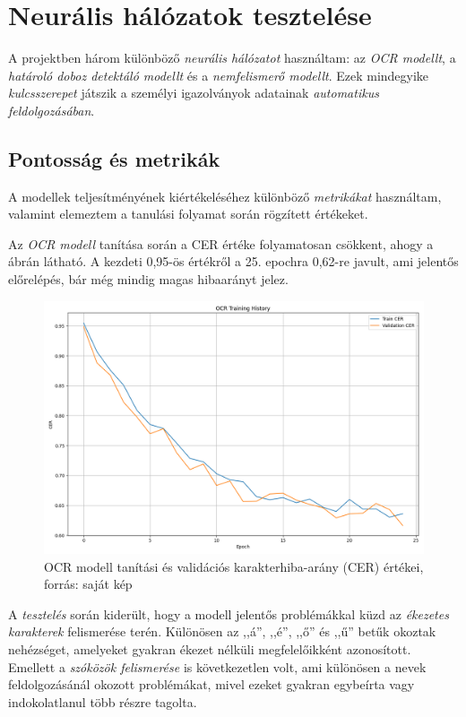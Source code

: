 \documentclass[
]{thesis-ekf}
\theoremstyle{definition}
\theoremstyle{remark}
\begin{document}
\section{Neurális hálózatok tesztelése} A projektben három különböző \emph{neurális hálózatot} használtam: az \emph{OCR modellt}, a \emph{határoló doboz detektáló modellt} és a \emph{nemfelismerő modellt}. Ezek mindegyike \emph{kulcsszerepet} játszik a személyi igazolványok adatainak \emph{automatikus feldolgozásában}.

\subsection{Pontosság és metrikák} A modellek teljesítményének kiértékeléséhez különböző \emph{metrikákat} használtam, valamint elemeztem a tanulási folyamat során rögzített értékeket.

Az \emph{OCR modell} tanítása során a CER értéke folyamatosan csökkent, ahogy a  ábrán látható. A kezdeti 0,95-ös értékről a 25. epochra 0,62-re javult, ami jelentős előrelépés, bár még mindig magas hibaarányt jelez.

\begin{figure} \centering \includegraphics[width=\textwidth]{ocr_training_history} \caption{OCR modell tanítási és validációs karakterhiba-arány (CER) értékei, forrás: saját kép} \label{fig-ocr-training} \end{figure}

A \emph{tesztelés} során kiderült, hogy a modell jelentős problémákkal küzd az \emph{ékezetes karakterek} felismerése terén. Különösen az ,,á'', ,,é'', ,,ő'' és ,,ű'' betűk okoztak nehézséget, amelyeket gyakran ékezet nélküli megfelelőikként azonosított. Emellett a \emph{szóközök felismerése} is következetlen volt, ami különösen a nevek feldolgozásánál okozott problémákat, mivel ezeket gyakran egybeírta vagy indokolatlanul több részre tagolta.
\end{document}
